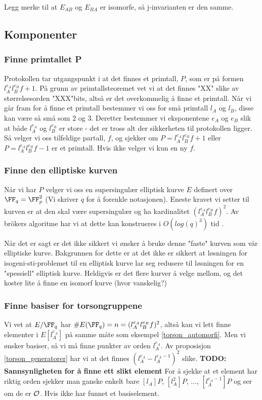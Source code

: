 Legg merke til at $E_{AB}$ og $E_{BA}$ er isomorfe, så j-invarianten er den samme.



\subsection{Komponenter}
\subsubsection{Finne primtallet P}
Protokollen tar utgangspunkt i at det finnes et primtall, $P$, som er på formen $l_A^{e_A}l_B^{e_B}f + 1$. På grunn av primtallsteoremet vet vi at det finnes "XX" slike av størrelsesorden "XXX"bits, altså er det overkommelig å finne et primtall. Når vi går fram for å finne et primtall bestemmer vi oss for små primtall $l_A$ og $l_B$, disse kan være så små som $2$ og $3$. Deretter bestemmer vi eksponentene $e_A$ og $e_B$ slik at både $l_A^{e_A}$ og $l_B^{e_B}$ er store - det er tross alt der sikkerheten til protokollen ligger. Så velger vi oss tilfeldige partall, $f$, og sjekker om $P = l_A^{e_A}l_B^{e_B}f + 1$ eller $P = l_A^{e_A}l_B^{e_B}f - 1$ er et primtall. Hvis ikke velger vi kun en ny $f$.
\subsubsection{Finne den elliptiske kurven}
Når vi har $P$ velger vi oss en supersingulær elliptisk kurve $E$ definert over $\FF_q = \FF_p^2$ (Vi skriver $q$ for å forenkle notasjonen). Eneste kravet vi setter til kurven er at den skal være supersingulær og ha kardinalitet $(l_A^{e_A}l_B^{e_B}f)^2$. Av brökers algoritme har vi at dette kan konstrueres i $O(log(q)^3)$ tid \cite{cunstructing_supersingular_elliptic_curves}.

Når det er sagt er det ikke sikkert vi ønsker å bruke denne "faste" kurven som vår elliptiske kurve. Bakgrunnen for dette er at det ikke er sikkert at løsningen for isogeni-sti-problemet til en elliptisk kurve lar seg redusere til løsningen for en "spessiell" elliptisk kurve. Heldigvis er det flere kurver å velge mellom, og det koster lite å finne en isomorf kurve (hvor vanskelig?)

\subsubsection{Finne basiser for torsongruppene}
Vi vet at $E/\FF_q$ har $\#E(\FF_q) = n = (l_A^{e_A}l_B^{e_B}f)^2$, altså kan vi lett finne elementer i $E[l_A^{e_A}]$ på samme måte som eksempel \ref{torson_automorfi}. Men vi ønsker basiser, så vi må finne punkter av orden $l_A^{e_A}$. Av proposisjon \ref{torson_generatorer} har vi at det finnes $(l_A^{e_A} - l_A^{e_A - 1})^2$ slike. \textbf{TODO: Sannsynligheten for å finne ett slikt element}
For å sjekke at et element har riktig orden sjekker man ganske enkelt bare $[l_A]P$, $[l_A^2]P$, $\ldots$, $[l_A^{e_A-1}]P$ og ser om de er $\mathcal{O}$. Hvis ikke har funnet et basiselement.

